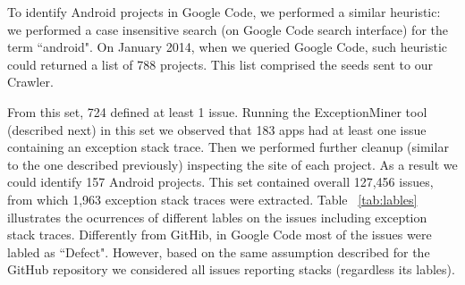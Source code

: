 \documentclass[conference]{IEEEtran}
\begin{document}
To identify Android projects in Google Code, we performed a similar heuristic: we performed a case insensitive search 
(on Google Code search interface) for the term ``android". On January 2014, when we queried Google Code, such heuristic could
 returned a list of 788  projects. This list comprised the seeds sent to our Crawler.

From this set, 724 defined at least 1 issue. Running the ExceptionMiner tool (described next)
 in this set we observed that 183 apps had at least one issue containing an exception stack trace.
 Then we performed further cleanup (similar to the one described previously) inspecting the site 
of each project. As a result we could identify 157 Android projects.  This set contained overall 127,456 issues,
 from which 1,963 exception stack traces were extracted. Table ~\ref{tab:lables} illustrates the ocurrences of different lables 
on the issues including exception stack traces. Differently from GitHib, in Google Code most of 
the issues were labled as ``Defect". However, based on the same assumption described for the GitHub repository
 we considered all issues reporting stacks (regardless its lables).




\end{document}
